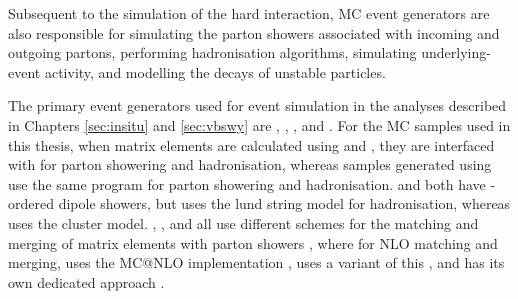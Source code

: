 Subsequent to the simulation of the hard interaction, MC event generators are also responsible for simulating the parton showers associated with incoming and outgoing partons, performing hadronisation algorithms, simulating underlying-event activity, and modelling the decays of unstable particles. 

The primary event generators used for event simulation in the analyses described in Chapters \ref{sec:insitu} and \ref{sec:vbswy} are \POWHEG \cite{Insitu:powheg1,Insitu:powheg2,Insitu:powheg3}, \PYTHIA \cite{Theory:Pythiamanual,Insitu:pythia}, \SHERPA \cite{Insitu:sherpa,Insitu:sherpa22}, and \MADGRAPH \cite{VBSWy:madgraph}. For the MC samples used in this thesis, when matrix elements are calculated using \POWHEG and \MADGRAPH, they are interfaced with \PYTHIA for parton showering and hadronisation, whereas samples generated using \SHERPA use the same program for parton showering and hadronisation. \PYTHIA and \SHERPA both have \pt-ordered dipole showers, but \PYTHIA uses the lund string model for hadronisation, whereas \SHERPA uses the cluster model. \MADGRAPH, \SHERPA, and \POWHEG all use different schemes for the matching and merging of matrix elements with parton showers \cite{Insitu:ckkw1,Insitu:ckkw2,Theory:MLM}, where for NLO matching and merging, \MADGRAPH uses the MC@NLO implementation \cite{Theory:MCnlo}, \SHERPA uses a variant of this \cite{Theory:sherpamatching}, and \POWHEG has its own dedicated approach \cite{Insitu:powheg3}.
%
